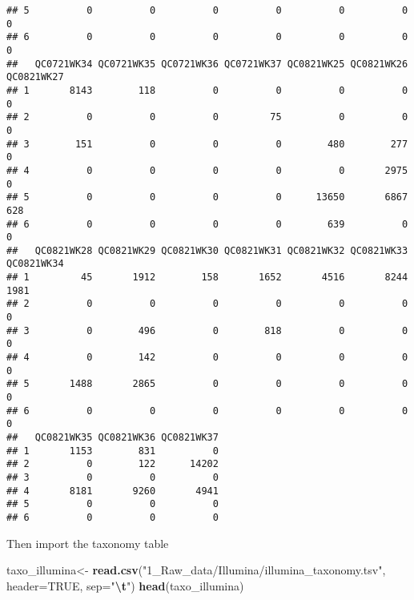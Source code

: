 \documentclass[
]{article}
\newenvironment{Shaded}{\begin{snugshade}}{\end{snugshade}}
\newcommand{\AttributeTok}[1]{\textcolor[rgb]{0.13,0.29,0.53}{#1}}
\newcommand{\ConstantTok}[1]{\textcolor[rgb]{0.56,0.35,0.01}{#1}}
\newcommand{\FunctionTok}[1]{\textcolor[rgb]{0.13,0.29,0.53}{\textbf{#1}}}
\newcommand{\NormalTok}[1]{#1}
\newcommand{\OtherTok}[1]{\textcolor[rgb]{0.56,0.35,0.01}{#1}}
\newcommand{\SpecialCharTok}[1]{\textcolor[rgb]{0.81,0.36,0.00}{\textbf{#1}}}
\newcommand{\StringTok}[1]{\textcolor[rgb]{0.31,0.60,0.02}{#1}}
\begin{document}
\begin{verbatim}
## 5          0          0          0          0          0          0          0
## 6          0          0          0          0          0          0          0
##   QC0721WK34 QC0721WK35 QC0721WK36 QC0721WK37 QC0821WK25 QC0821WK26 QC0821WK27
## 1       8143        118          0          0          0          0          0
## 2          0          0          0         75          0          0          0
## 3        151          0          0          0        480        277          0
## 4          0          0          0          0          0       2975          0
## 5          0          0          0          0      13650       6867        628
## 6          0          0          0          0        639          0          0
##   QC0821WK28 QC0821WK29 QC0821WK30 QC0821WK31 QC0821WK32 QC0821WK33 QC0821WK34
## 1         45       1912        158       1652       4516       8244       1981
## 2          0          0          0          0          0          0          0
## 3          0        496          0        818          0          0          0
## 4          0        142          0          0          0          0          0
## 5       1488       2865          0          0          0          0          0
## 6          0          0          0          0          0          0          0
##   QC0821WK35 QC0821WK36 QC0821WK37
## 1       1153        831          0
## 2          0        122      14202
## 3          0          0          0
## 4       8181       9260       4941
## 5          0          0          0
## 6          0          0          0
\end{verbatim}

Then import the taxonomy table

\begin{Shaded}
\begin{Highlighting}[]
\NormalTok{taxo\_illumina}\OtherTok{\textless{}{-}} \FunctionTok{read.csv}\NormalTok{(}\StringTok{"1\_Raw\_data/Illumina/illumina\_taxonomy.tsv"}\NormalTok{, }
                        \AttributeTok{header=}\ConstantTok{TRUE}\NormalTok{, }\AttributeTok{sep=}\StringTok{"}\SpecialCharTok{\textbackslash{}t}\StringTok{"}\NormalTok{)}
\FunctionTok{head}\NormalTok{(taxo\_illumina)}
\end{Highlighting}
\end{Shaded}
\end{document}
